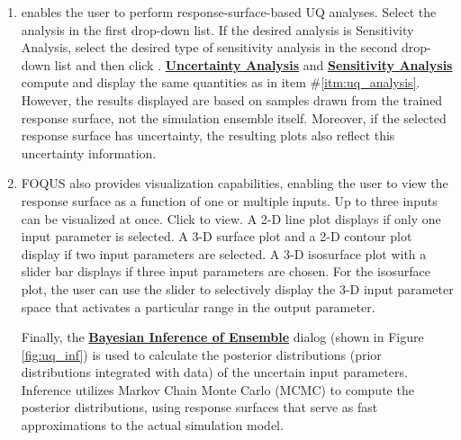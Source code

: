 \begin{enumerate}
\item
	 enables the user to perform
	response-surface-based UQ analyses. 
   Select the analysis in the first drop-down list. If the desired analysis is Sensitivity Analysis, select the desired type of sensitivity
	analysis in the second drop-down list and then
	click . \textbf{\underline{Uncertainty Analysis}} and \textbf{\underline{Sensitivity Analysis}}
	compute and display the same quantities as in item
	\#\ref{itm:uq_analysis}. However, the results displayed are based on
	samples drawn from the trained response surface, not the simulation
	ensemble itself. Moreover, if the selected response surface has
	uncertainty, the resulting plots also reflect this uncertainty
	information.
\item
	FOQUS also provides visualization capabilities, enabling the user to 
   view the response surface as a function of one or multiple inputs. 
   Up to three inputs can be visualized at once. Click  to view. 
   A 2-D line plot displays if only one input parameter is selected. A 3-D
	surface plot and a 2-D contour plot display if two input parameters are
	selected. A 3-D isosurface plot with a slider bar displays if three
	input parameters are chosen. For the isosurface plot, the user can use
	the slider to selectively display the
	3-D input parameter space that activates a particular range in the
	output parameter. %

Finally, the \textbf{\underline{Bayesian Inference of Ensemble}} dialog (shown in Figure \ref{fig:uq_inf})
is used to calculate the posterior distributions (prior distributions
integrated with data) of the uncertain input parameters. 
Inference utilizes Markov Chain Monte Carlo
(MCMC) to compute the posterior distributions, using response surfaces
that serve as fast approximations to the actual simulation model.



\end{enumerate}
